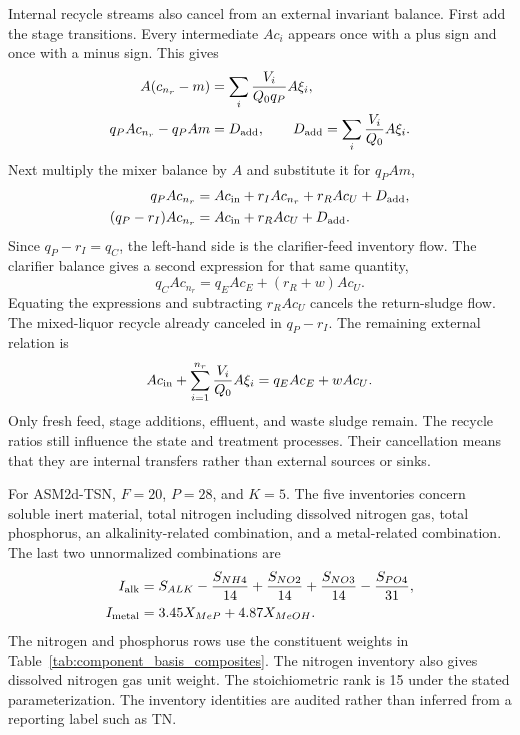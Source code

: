 Internal recycle streams also cancel from an external invariant balance. First add the stage transitions. Every intermediate $Ac_i$ appears once with a plus sign and once with a minus sign. This gives
\begin{align}
A(c_{n_r}-m)&=\sum_i\frac{V_i}{Q_0q_P}A\xi_i,\\
q_PAc_{n_r}-q_PAm&=D_{\rm add},\qquad
D_{\rm add}=\sum_i\frac{V_i}{Q_0}A\xi_i.
\end{align}
Next multiply the mixer balance by $A$ and substitute it for $q_PAm$,
\begin{align}
q_PAc_{n_r}&=Ac_{\rm in}+r_IAc_{n_r}+r_RAc_U+D_{\rm add},\\
(q_P-r_I)Ac_{n_r}&=Ac_{\rm in}+r_RAc_U+D_{\rm add}.
\end{align}
Since $q_P-r_I=q_C$, the left-hand side is the clarifier-feed inventory flow. The clarifier balance gives a second expression for that same quantity,
\begin{equation}
q_CAc_{n_r}=q_EAc_E+(r_R+w)Ac_U.
\end{equation}
Equating the expressions and subtracting $r_RAc_U$ cancels the return-sludge flow. The mixed-liquor recycle already canceled in $q_P-r_I$. The remaining external relation is
\begin{equation}
Ac_{\rm in}+\sum_{i=1}^{n_r}\frac{V_i}{Q_0}A\xi_i
=q_EAc_E+wAc_U.
\label{eq:plant_external_invariant}
\end{equation}
Only fresh feed, stage additions, effluent, and waste sludge remain. The recycle ratios still influence the state and treatment processes. Their cancellation means that they are internal transfers rather than external sources or sinks.

For ASM2d-TSN, $F=20$, $P=28$, and $K=5$. The five inventories concern soluble inert material, total nitrogen including dissolved nitrogen gas, total phosphorus, an alkalinity-related combination, and a metal-related combination. The last two unnormalized combinations are
\begin{align}
I_{\rm alk}&=S_{ALK}-\frac{S_{NH4}}{14}
+\frac{S_{NO2}}{14}+\frac{S_{NO3}}{14}-\frac{S_{PO4}}{31},\\
I_{\rm metal}&=3.45X_{MeP}+4.87X_{MeOH}.
\label{eq:plant_named_invariants}
\end{align}
The nitrogen and phosphorus rows use the constituent weights in Table~\ref{tab:component_basis_composites}. The nitrogen inventory also gives dissolved nitrogen gas unit weight. The stoichiometric rank is 15 under the stated parameterization. The inventory identities are audited rather than inferred from a reporting label such as TN.

